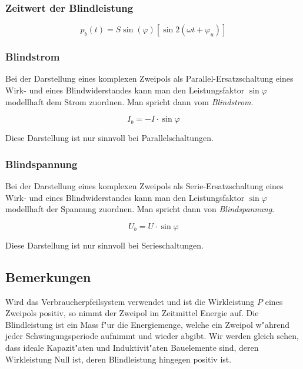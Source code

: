 \documentclass[german, 10pt, a4paper, headsepline]{scrreprt}
\theoremstyle{remark}
\begin{document}
\subsubsection{Zeitwert der Blindleistung}

\begin{displaymath}
	p_b(t) = S\sin(\varphi)[\sin 2(\omega t + \varphi_u)]
\end{displaymath}

\subsubsection{Blindstrom}

Bei der Darstellung eines komplexen Zweipols als Parallel-Ersatzschaltung eines Wirk- und eines Blindwiderstandes kann man den Leistungsfaktor $\sin\varphi$ modellhaft dem Strom zuordnen. Man spricht dann vom \textit{Blindstrom}.

\begin{displaymath}
	I_b =  -I \cdotp \sin \varphi
\end{displaymath}

Diese Darstellung ist nur sinnvoll bei Parallelschaltungen.

\subsubsection{Blindspannung}

Bei der Darstellung eines komplexen Zweipols als Serie-Ersatzschaltung eines Wirk- und eines Blindwiderstandes kann man den Leistungsfaktor $\sin\varphi$ modellhaft der Spannung zuordnen. Man spricht dann von \textit{Blindspannung}.

\begin{displaymath}
	U_b = U \cdotp \sin \varphi
\end{displaymath}

Diese Darstellung ist nur sinnvoll bei Serieschaltungen.

\subsection{Bemerkungen}

Wird das Verbraucherpfeilsystem verwendet und ist die Wirkleistung $P$ eines Zweipols positiv, so nimmt der Zweipol im Zeitmittel Energie auf. Die Blindleistung ist ein Mass f"ur die Energiemenge, welche ein Zweipol w"ahrend jeder Schwingungsperiode aufnimmt und wieder abgibt. Wir werden gleich sehen, dass ideale Kapazit"aten und Induktivit"aten Bauelemente sind, deren Wirkleistung Null ist, deren Blindleistung hingegen positiv ist.
\end{document}
